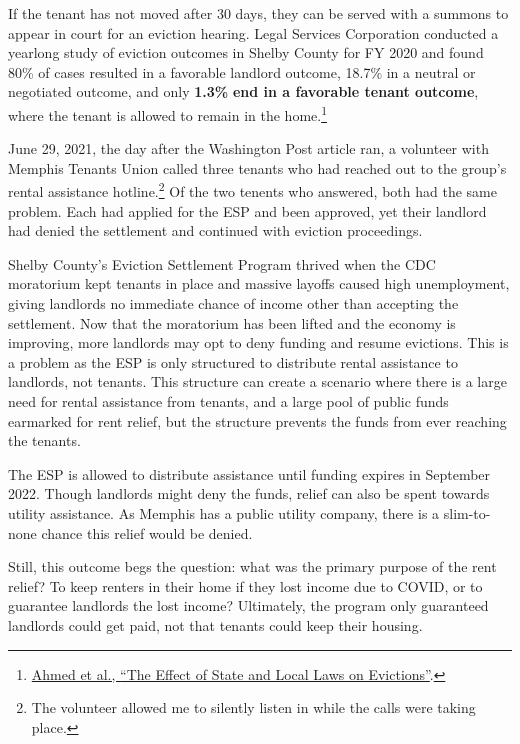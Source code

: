 \documentclass[
  openany]{book}
\begin{document}
If the tenant has not moved after 30 days, they can be served with a summons to appear in court for an eviction hearing. Legal Services Corporation conducted a yearlong study of eviction outcomes in Shelby County for FY 2020 and found 80\% of cases resulted in a favorable landlord outcome, 18.7\% in a neutral or negotiated outcome, and only \textbf{1.3\%} \textbf{end in a favorable tenant outcome}, where the tenant is allowed to remain in the home.\footnote{\protect\hyperlink{ref-ahmed2021}{Ahmed et al., {``The Effect of State and Local Laws on Evictions''}}.}

June 29, 2021, the day after the Washington Post article ran, a volunteer with Memphis Tenants Union called three tenants who had reached out to the group's rental assistance hotline.\footnote{The volunteer allowed me to silently listen in while the calls were taking place.} Of the two tenents who answered, both had the same problem. Each had applied for the ESP and been approved, yet their landlord had denied the settlement and continued with eviction proceedings.

Shelby County's Eviction Settlement Program thrived when the CDC moratorium kept tenants in place and massive layoffs caused high unemployment, giving landlords no immediate chance of income other than accepting the settlement. Now that the moratorium has been lifted and the economy is improving, more landlords may opt to deny funding and resume evictions. This is a problem as the ESP is only structured to distribute rental assistance to landlords, not tenants. This structure can create a scenario where there is a large need for rental assistance from tenants, and a large pool of public funds earmarked for rent relief, but the structure prevents the funds from ever reaching the tenants.

The ESP is allowed to distribute assistance until funding expires in September 2022. Though landlords might deny the funds, relief can also be spent towards utility assistance. As Memphis has a public utility company, there is a slim-to-none chance this relief would be denied.

Still, this outcome begs the question: what was the primary purpose of the rent relief? To keep renters in their home if they lost income due to COVID, or to guarantee landlords the lost income? Ultimately, the program only guaranteed landlords could get paid, not that tenants could keep their housing.
\end{document}
